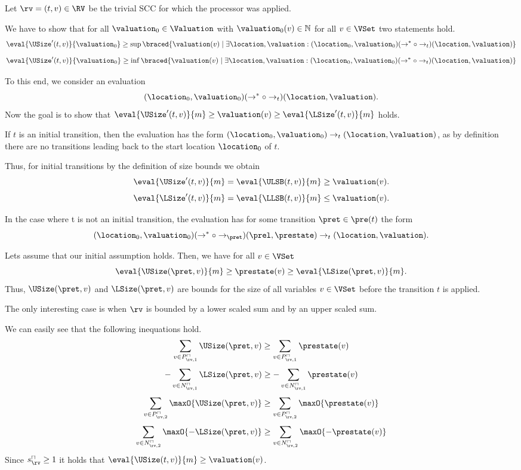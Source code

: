 Let $\rv = (t, v) \in \RV$ be the trivial SCC for which the processor was applied.

We have to show that for all $\valuation_0 \in \Valuation$ with $\valuation_0(v) \in \mathbb{N}$ for all $v \in \VSet$ two statements hold.
\[ \eval{\USize'(t, v)}{\valuation_0} \geq \sup \braced{ \valuation(v) \mid \exists \location, \valuation: (\location_0, \valuation_0) (\rightarrow^* \circ \rightarrow_t) (\location, \valuation)} \]
\[ \eval{\USize'(t, v)}{\valuation_0} \geq \inf \braced{ \valuation(v) \mid \exists \location, \valuation: (\location_0, \valuation_0) (\rightarrow^* \circ \rightarrow_t) (\location, \valuation)} \]

To this end, we consider an evaluation
\[ (\location_0, \valuation_0) (\rightarrow^* \circ \rightarrow_t) (\location, \valuation). \]
Now the goal is to show that $\eval{\USize'(t, v)}{m} \geq \valuation(v) \geq \eval{\LSize'(t, v)}{m}$ holds.

If $t$ is an initial transition, then the evaluation has the form $(\location_0, \valuation_0) \rightarrow_t (\location, \valuation)$, as by definition there are no transitions leading back to the start location $\location_0$ of $t$.

Thus, for initial transitions by the definition of size bounds we obtain
\[ \eval{\USize'(t, v)}{m} = \eval{\ULSB(t, v)}{m} \geq \valuation(v). \]
\[ \eval{\LSize'(t, v)}{m} = \eval{\LLSB(t, v)}{m} \leq \valuation(v). \]

In the case where t is not an initial transition, the evaluation has for some transition $\pret \in \pre(t)$ the form
\[ (\location_0, \valuation_0) (\rightarrow^* \circ \rightarrow_\pret) (\prel, \prestate) \rightarrow_t (\location, \valuation). \]

Lets assume that our initial assumption holds.
Then, we have for all $v \in \VSet$
\[ \eval{\USize(\pret, v)}{m} \geq \prestate(v) \geq \eval{\LSize(\pret, v)}{m}. \]
Thus, $\USize(\pret, v)$ and $\LSize(\pret, v)$ are bounds for the size of all variables $v \in \VSet$ before the transition $t$ is applied.

The only interesting case is when $\rv$ is bounded by a lower scaled sum and by an upper scaled sum.

We can easily see that the following inequations hold.
\[ \sum_{v \in P_{\rv,1}^\sqcap} \USize(\pret, v) \geq \sum_{v \in P_{\rv,1}^\sqcap} \prestate(v) \]
\[ - \sum_{v \in N_{\rv,1}^\sqcap} \LSize(\pret, v) \geq - \sum_{v \in N_{\rv,1}^\sqcap} \prestate(v) \]
\[ \sum_{v \in P_{\rv,2}^\sqcap} \maxO{\USize(\pret, v)} \geq \sum_{v \in P_{\rv,2}^\sqcap} \maxO{\prestate(v)} \]
\[ \sum_{v \in N_{\rv,2}^\sqcap} \maxO{-\LSize(\pret, v)} \geq \sum_{v \in N_{\rv,2}^\sqcap} \maxO{-\prestate(v)} \]
Since $s^\sqcap_\rv \geq 1$ it holds that $\eval{\USize(t, v)}{m} \geq \valuation(v)$.


